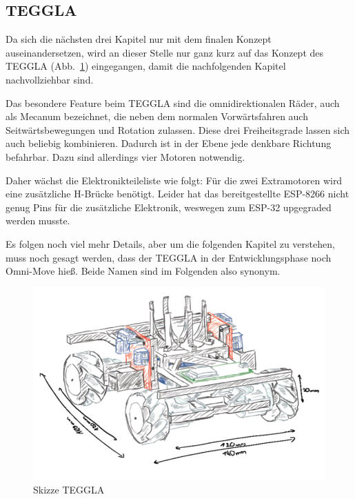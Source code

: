 \subsection{TEGGLA}
Da sich die nächsten drei Kapitel nur mit dem finalen Konzept auseinandersetzen, wird an dieser Stelle nur ganz kurz auf das Konzept des TEGGLA (Abb.~\ref{bild:tegglaskizze}) eingegangen, damit die nachfolgenden Kapitel nachvollziehbar sind. 

Das besondere Feature beim TEGGLA sind die omnidirektionalen Räder, auch als Mecanum bezeichnet, die neben dem normalen Vorwärtsfahren auch Seitwärtsbewegungen und Rotation zulassen. 
Diese drei Freiheitsgrade lassen sich auch beliebig kombinieren. 
Dadurch ist in der Ebene jede denkbare Richtung befahrbar. Dazu sind allerdings vier Motoren notwendig. 

Daher wächst die Elektronikteileliste wie folgt: Für die zwei Extramotoren wird eine zusätzliche H-Brücke benötigt. 
Leider hat das bereitgestellte ESP-8266 nicht genug Pins für die zusätzliche Elektronik, weswegen zum ESP-32 upgegraded werden musste. 

Es folgen noch viel mehr Details, aber um die folgenden Kapitel zu verstehen, muss noch gesagt werden, dass der TEGGLA in der Entwicklungsphase noch Omni-Move hieß. Beide Namen sind im Folgenden also synonym. 

\begin{figure}[!ht]
	\centering
	\includegraphics[width=\textwidth]{bilder/tegglaskizze.png}
	\caption{Skizze TEGGLA}
	\label{bild:tegglaskizze}
\end{figure}


